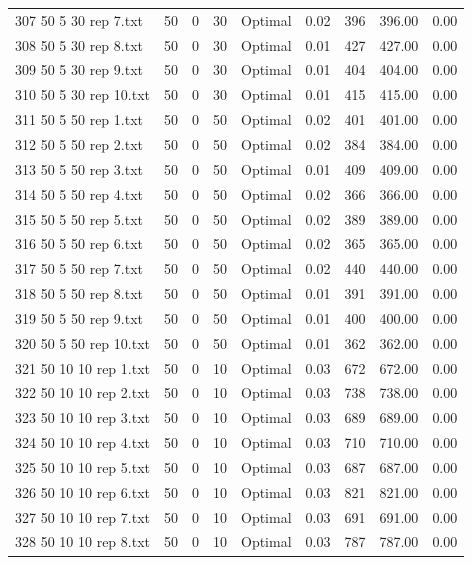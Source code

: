 \begin{longtable}{lrrllrrrr}
307 50 5 30 rep 7.txt & 50 & 0 & 30 & Optimal &  0.02 & 396 & 396.00 &  0.00\\
308 50 5 30 rep 8.txt & 50 & 0 & 30 & Optimal &  0.01 & 427 & 427.00 &  0.00\\
309 50 5 30 rep 9.txt & 50 & 0 & 30 & Optimal &  0.01 & 404 & 404.00 &  0.00\\
310 50 5 30 rep 10.txt & 50 & 0 & 30 & Optimal &  0.01 & 415 & 415.00 &  0.00\\
311 50 5 50 rep 1.txt & 50 & 0 & 50 & Optimal &  0.02 & 401 & 401.00 &  0.00\\
312 50 5 50 rep 2.txt & 50 & 0 & 50 & Optimal &  0.02 & 384 & 384.00 &  0.00\\
313 50 5 50 rep 3.txt & 50 & 0 & 50 & Optimal &  0.01 & 409 & 409.00 &  0.00\\
314 50 5 50 rep 4.txt & 50 & 0 & 50 & Optimal &  0.02 & 366 & 366.00 &  0.00\\
315 50 5 50 rep 5.txt & 50 & 0 & 50 & Optimal &  0.02 & 389 & 389.00 &  0.00\\
316 50 5 50 rep 6.txt & 50 & 0 & 50 & Optimal &  0.02 & 365 & 365.00 &  0.00\\
317 50 5 50 rep 7.txt & 50 & 0 & 50 & Optimal &  0.02 & 440 & 440.00 &  0.00\\
318 50 5 50 rep 8.txt & 50 & 0 & 50 & Optimal &  0.01 & 391 & 391.00 &  0.00\\
319 50 5 50 rep 9.txt & 50 & 0 & 50 & Optimal &  0.01 & 400 & 400.00 &  0.00\\
320 50 5 50 rep 10.txt & 50 & 0 & 50 & Optimal &  0.01 & 362 & 362.00 &  0.00\\
321 50 10 10 rep 1.txt & 50 & 0 & 10 & Optimal &  0.03 & 672 & 672.00 &  0.00\\
322 50 10 10 rep 2.txt & 50 & 0 & 10 & Optimal &  0.03 & 738 & 738.00 &  0.00\\
323 50 10 10 rep 3.txt & 50 & 0 & 10 & Optimal &  0.03 & 689 & 689.00 &  0.00\\
324 50 10 10 rep 4.txt & 50 & 0 & 10 & Optimal &  0.03 & 710 & 710.00 &  0.00\\
325 50 10 10 rep 5.txt & 50 & 0 & 10 & Optimal &  0.03 & 687 & 687.00 &  0.00\\
326 50 10 10 rep 6.txt & 50 & 0 & 10 & Optimal &  0.03 & 821 & 821.00 &  0.00\\
327 50 10 10 rep 7.txt & 50 & 0 & 10 & Optimal &  0.03 & 691 & 691.00 &  0.00\\
328 50 10 10 rep 8.txt & 50 & 0 & 10 & Optimal &  0.03 & 787 & 787.00 &  0.00\\

\end{longtable}
